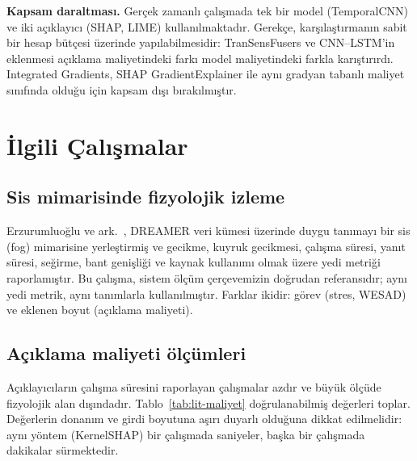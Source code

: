 \documentclass[conference]{IEEEtran}
\begin{document}
\textbf{Kapsam daraltması.} Gerçek zamanlı çalışmada tek bir model (TemporalCNN)
ve iki açıklayıcı (SHAP, LIME) kullanılmaktadır. Gerekçe, karşılaştırmanın sabit
bir hesap bütçesi üzerinde yapılabilmesidir: TranSensFusers ve CNN--LSTM'in
eklenmesi açıklama maliyetindeki farkı model maliyetindeki farkla karıştırırdı.
Integrated Gradients, SHAP GradientExplainer ile aynı gradyan tabanlı maliyet
sınıfında olduğu için kapsam dışı bırakılmıştır.

\section{İlgili Çalışmalar}

\subsection{Sis mimarisinde fizyolojik izleme}

Erzurumluoğlu ve ark.\ \cite{erzurumluoglu2025}, DREAMER veri kümesi üzerinde
duygu tanımayı bir sis (fog) mimarisine yerleştirmiş ve gecikme, kuyruk
gecikmesi, çalışma süresi, yanıt süresi, seğirme, bant genişliği ve kaynak
kullanımı olmak üzere yedi metriği raporlamıştır. Bu çalışma, sistem ölçüm
çerçevemizin doğrudan referansıdır; aynı yedi metrik, aynı tanımlarla
kullanılmıştır. Farklar ikidir: görev (stres, WESAD) ve eklenen boyut
(açıklama maliyeti).

\subsection{Açıklama maliyeti ölçümleri}

Açıklayıcıların çalışma süresini raporlayan çalışmalar azdır ve büyük ölçüde
fizyolojik alan dışındadır. Tablo~\ref{tab:lit-maliyet} doğrulanabilmiş
değerleri toplar. Değerlerin donanım ve girdi boyutuna aşırı duyarlı olduğuna
dikkat edilmelidir: aynı yöntem (KernelSHAP) bir çalışmada saniyeler, başka bir
çalışmada dakikalar sürmektedir.
\end{document}
